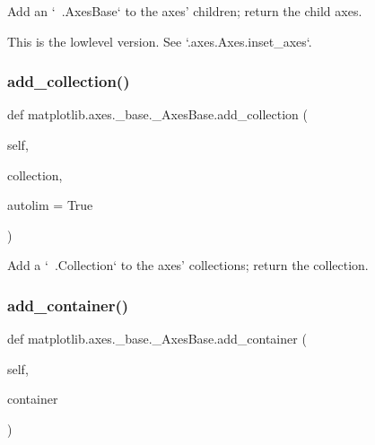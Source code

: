 \begin{DoxyVerb}Add an `~.AxesBase` to the axes' children; return the child axes.

This is the lowlevel version.  See `.axes.Axes.inset_axes`.
\end{DoxyVerb}
 \mbox{\label{classmatplotlib_1_1axes_1_1__base_1_1__AxesBase_aa36505671b067609db351ac24ebca085}} 
\subsubsection{\texorpdfstring{add\+\_\+collection()}{add\_collection()}}
{\footnotesize\ttfamily def matplotlib.\+axes.\+\_\+base.\+\_\+\+Axes\+Base.\+add\+\_\+collection (\begin{DoxyParamCaption}\item[{}]{self,  }\item[{}]{collection,  }\item[{}]{autolim = {\ttfamily True} }\end{DoxyParamCaption})}

\begin{DoxyVerb}Add a `~.Collection` to the axes' collections; return the collection.
\end{DoxyVerb}
 \mbox{\label{classmatplotlib_1_1axes_1_1__base_1_1__AxesBase_a62d4122ff8d0d5de43f6acabc9ba06b8}} 
\subsubsection{\texorpdfstring{add\+\_\+container()}{add\_container()}}
{\footnotesize\ttfamily def matplotlib.\+axes.\+\_\+base.\+\_\+\+Axes\+Base.\+add\+\_\+container (\begin{DoxyParamCaption}\item[{}]{self,  }\item[{}]{container }\end{DoxyParamCaption})}

